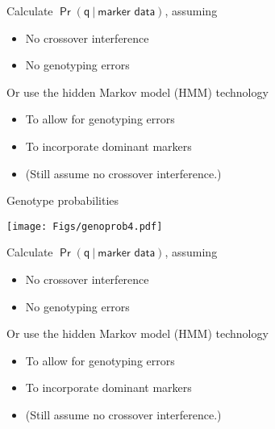 \documentclass[12pt]{article}
\newcommand{\headsize}{\fontsize{35}{35} \selectfont}
\newcommand{\smallersize}{\fontsize{20}{25} \selectfont}
\begin{document}
\hfill
\begin{minipage}{10in}
\color{mywhite} \smallersize
Calculate {\color{myblue} $\mathsf{\Pr(q \ | \ \text{marker data})}$}, assuming
\begin{itemize}
\item No crossover interference
\item No genotyping errors
\end{itemize}

\vspace{10mm}

Or use the {\color{mypink} hidden Markov model (HMM)} technology
\begin{itemize}
\item To allow for genotyping errors
\item To incorporate dominant markers
\item {\color{myblue} (Still assume no crossover interference.)}
\end{itemize}
\end{minipage}


\newpage

\addtocounter{page}{-1}

\headsize \color{myyellow}
\hfill \begin{minipage}{5.75in}
\centering
Genotype probabilities
\end{minipage}

\vspace{15mm}

\centerline{\texttt{[image: Figs/genoprob4.pdf]}}

\vspace{15mm}

\hfill
\begin{minipage}{10in}
\color{mywhite} \smallersize
Calculate {\color{myblue} $\mathsf{\Pr(q \ | \ \text{marker data})}$}, assuming
\begin{itemize}
\item No crossover interference
\item No genotyping errors
\end{itemize}

\vspace{10mm}

Or use the {\color{mypink} hidden Markov model (HMM)} technology
\begin{itemize}
\item To allow for genotyping errors
\item To incorporate dominant markers
\item {\color{myblue} (Still assume no crossover interference.)}
\end{itemize}
\end{minipage}
\end{document}
